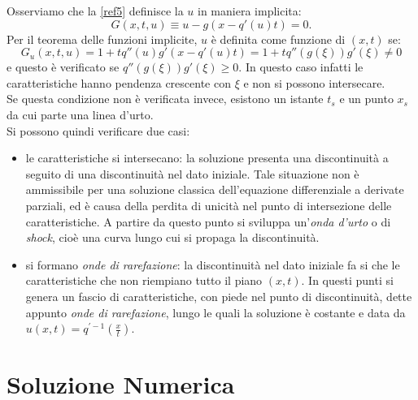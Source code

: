 \noindent Osserviamo che la \ref{ref5} definisce la $u$ in maniera implicita:
$$G(x, t, u) \equiv u - g(x - q'(u)t) = 0. $$
Per il teorema delle funzioni implicite, $u$ è definita come funzione di $(x, t)$ se:
$$G_u(x, t, u) = 1+tq''(u)g'(x-q'(u)t)=1+tq''(g(\xi))g'(\xi) \ne 0 $$
\noindent e questo è verificato se $q''(g(\xi))g'(\xi) \ge 0$. In questo caso infatti le caratteristiche hanno pendenza crescente con $\xi$ e non si possono intersecare.\\
Se questa condizione non è verificata invece, esistono un istante $t_s$ e un punto $x_s$ da cui parte una linea d'urto.\\
\noindent Si possono quindi verificare due casi:
\begin{itemize} 
\item le caratteristiche si intersecano: la soluzione presenta una discontinuità a seguito di una discontinuità nel dato iniziale. Tale situazione non è ammissibile per una
soluzione classica dell’equazione differenziale a derivate parziali, ed è causa della perdita di unicità nel punto di intersezione delle caratteristiche. A partire da questo punto si sviluppa un'\textit{onda  d'urto} o di \textit{shock}, cioè una curva lungo cui si propaga la discontinuità.
\item si formano \textit{onde di rarefazione}: la discontinuità nel dato iniziale fa si che le caratteristiche che non riempiano tutto il piano $(x, t)$. In questi punti si genera un fascio di caratteristiche, con piede nel punto di discontinuità, dette appunto \textit{onde di rarefazione}, lungo le quali la soluzione è costante e data da $u(x, t) = q^{'-1} \left ( \frac{x}{t} \right ) $. 
\end{itemize}








\section{Soluzione Numerica}
